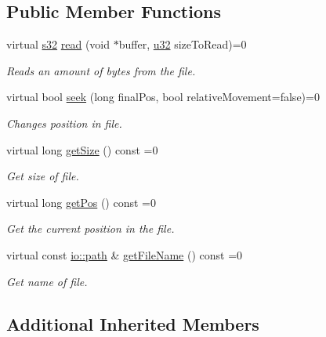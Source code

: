 \subsection*{Public Member Functions}
\begin{DoxyCompactItemize}
\item 
virtual \hyperlink{namespaceirr_ac66849b7a6ed16e30ebede579f9b47c6}{s32} \hyperlink{classirr_1_1io_1_1IReadFile_ab51878d36bc9dd3964b664055fbeb13f}{read} (void $\ast$buffer, \hyperlink{namespaceirr_a0416a53257075833e7002efd0a18e804}{u32} size\+To\+Read)=0
\begin{DoxyCompactList}\small\item\em Reads an amount of bytes from the file. \end{DoxyCompactList}\item 
virtual bool \hyperlink{classirr_1_1io_1_1IReadFile_ac1cd81f18832e8703838d7abd495bf34}{seek} (long final\+Pos, bool relative\+Movement=false)=0
\begin{DoxyCompactList}\small\item\em Changes position in file. \end{DoxyCompactList}\item 
virtual long \hyperlink{classirr_1_1io_1_1IReadFile_a9c64fca7f1d665d7e458cd7d766c35a2}{get\+Size} () const =0
\begin{DoxyCompactList}\small\item\em Get size of file. \end{DoxyCompactList}\item 
virtual long \hyperlink{classirr_1_1io_1_1IReadFile_aeee143ee38871c30f240c025b100941d}{get\+Pos} () const =0
\begin{DoxyCompactList}\small\item\em Get the current position in the file. \end{DoxyCompactList}\item 
virtual const \hyperlink{namespaceirr_1_1io_ab1bdc45edb3f94d8319c02bc0f840ee1}{io\+::path} \& \hyperlink{classirr_1_1io_1_1IReadFile_a73b9c884319d2e4b0ff9a7ea15cbf316}{get\+File\+Name} () const =0
\begin{DoxyCompactList}\small\item\em Get name of file. \end{DoxyCompactList}\end{DoxyCompactItemize}
\subsection*{Additional Inherited Members}


